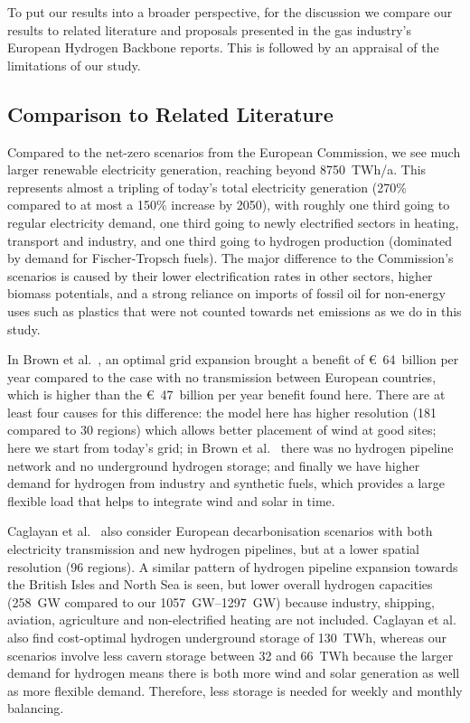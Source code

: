 To put our results into a broader perspective, for the discussion we compare our
results to related literature and proposals presented in the gas industry's
European Hydrogen Backbone reports. This is followed by an appraisal of the
limitations of our study.

\subsection*{Comparison to Related Literature}

Compared to the net-zero scenarios from the European
Commission\cite{in-depth_2018}, we see much larger renewable electricity
generation, reaching beyond 8750~TWh/a. This represents almost a tripling of
today's total electricity generation (270\% compared to at most a 150\% increase
by 2050\cite{in-depth_2018}), with roughly one third going to regular
electricity demand, one third going to newly electrified sectors in heating,
transport and industry, and one third going to hydrogen production (dominated by
demand for Fischer-Tropsch fuels). The major difference to the Commission's
scenarios\cite{in-depth_2018} is caused by their lower electrification rates in
other sectors, higher biomass potentials, and a strong reliance on imports of
fossil oil for non-energy uses such as plastics that were not counted towards
net emissions as we do in this study.

In Brown et al.~\cite{brownSynergiesSector2018}, an optimal grid expansion
brought a benefit of \euro~64~billion per year compared to the case with no
transmission between European countries, which is higher than the
\euro~47~billion per year benefit found here. There are at least four causes for
this difference: the model here has higher resolution (181 compared to 30
regions) which allows better placement of wind at good sites; here we start from
today's grid; in Brown et al.~\cite{brownSynergiesSector2018} there was no
hydrogen pipeline network and no underground hydrogen storage; and finally we
have higher demand for hydrogen from industry and synthetic fuels, which
provides a large flexible load that helps to integrate wind and solar in time.

Caglayan et al.~\cite{Caglayan2019} also consider European decarbonisation
scenarios with both electricity transmission and new hydrogen pipelines, but at
a lower spatial resolution (96 regions). A similar pattern of hydrogen pipeline
expansion towards the British Isles and North Sea is seen, but lower overall
hydrogen capacities (258~GW compared to our \SIrange{1057}{1297}{\giga\watt})
because industry, shipping, aviation, agriculture and non-electrified heating
are not included. Caglayan et al.~\cite{Caglayan2019} also find cost-optimal
hydrogen underground storage of 130~TWh, whereas our scenarios involve less
cavern storage between 32 and 66~TWh because the larger demand for hydrogen
means there is both more wind and solar generation as well as more flexible demand.
Therefore, less storage is needed for weekly and monthly balancing.

